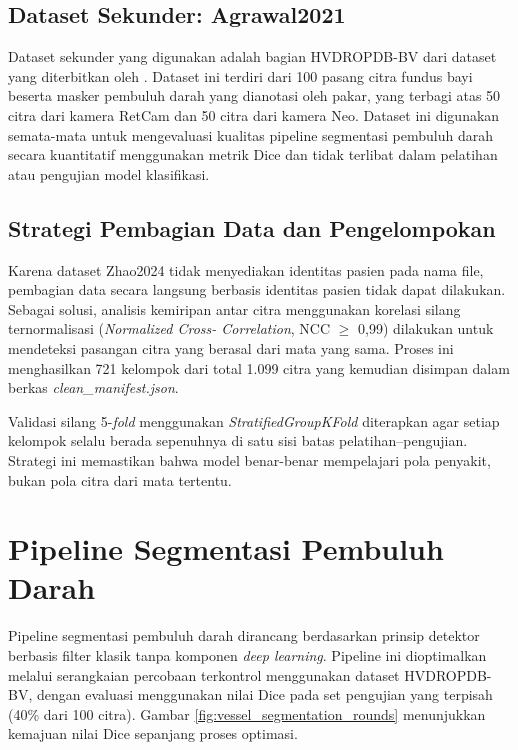 \subsection{Dataset Sekunder: Agrawal2021}

Dataset sekunder yang digunakan adalah bagian HVDROPDB-BV dari dataset yang diterbitkan oleh
\citet{Agrawal2021}. Dataset ini terdiri dari 100 pasang citra fundus bayi beserta masker
pembuluh darah yang dianotasi oleh pakar, yang terbagi atas 50 citra dari kamera RetCam dan
50 citra dari kamera Neo. Dataset ini digunakan semata-mata untuk mengevaluasi kualitas
pipeline segmentasi pembuluh darah secara kuantitatif menggunakan metrik Dice dan tidak
terlibat dalam pelatihan atau pengujian model klasifikasi.

\subsection{Strategi Pembagian Data dan Pengelompokan}

Karena dataset Zhao2024 tidak menyediakan identitas pasien pada nama file, pembagian data
secara langsung berbasis identitas pasien tidak dapat dilakukan. Sebagai solusi, analisis
kemiripan antar citra menggunakan korelasi silang ternormalisasi (\textit{Normalized Cross-
Correlation}, NCC $\geq$ 0,99) dilakukan untuk mendeteksi pasangan citra yang berasal dari
mata yang sama. Proses ini menghasilkan 721 kelompok dari total 1.099 citra yang kemudian
disimpan dalam berkas \textit{clean\_manifest.json}.

Validasi silang 5-\textit{fold} menggunakan \textit{StratifiedGroupKFold} diterapkan agar
setiap kelompok selalu berada sepenuhnya di satu sisi batas pelatihan--pengujian. Strategi ini
memastikan bahwa model benar-benar mempelajari pola penyakit, bukan pola citra dari mata
tertentu.

\section{Pipeline Segmentasi Pembuluh Darah}

Pipeline segmentasi pembuluh darah dirancang berdasarkan prinsip detektor berbasis filter
klasik tanpa komponen \textit{deep learning}. Pipeline ini dioptimalkan melalui serangkaian
percobaan terkontrol menggunakan dataset HVDROPDB-BV, dengan evaluasi menggunakan nilai Dice
pada set pengujian yang terpisah (40\% dari 100 citra). Gambar \ref{fig:vessel_segmentation_rounds}
menunjukkan kemajuan nilai Dice sepanjang proses optimasi.

